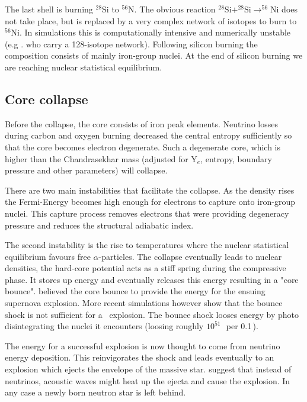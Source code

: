 The last shell is burning $^{28}$Si to $^{56}$N. The obvious reaction $^{28}\textrm{Si}+^{28}\textrm{Si}\rightarrow^{56}\textrm{Ni}$ does not take place, but is replaced by a very complex network of isotopes to burn to $^{56}\textrm{Ni}$. In simulations this is computationally intensive and numerically unstable (e.g .  \citet{1978ApJ...225.1021W} who carry a 128-isotope network). 
Following silicon burning the composition consists of mainly iron-group nuclei. 
At the end of silicon burning we are reaching nuclear statistical equilibrium. 

\subsection{Core collapse} Before the collapse,  the core consists of iron peak elements. Neutrino losses during carbon and oxygen burning decreased the central entropy sufficiently so that the core becomes electron degenerate. Such a degenerate core, which is higher than the Chandrasekhar mass (adjusted for Y$_e$, entropy, boundary pressure and other parameters) will collapse. 

There are two main instabilities that facilitate the collapse. As the density rises the Fermi-Energy becomes high enough for electrons to capture onto iron-group nuclei. This capture process removes electrons that were providing degeneracy pressure and reduces the structural adiabatic index. 

The second instability is the rise to temperatures where the nuclear statistical equilibrium favours free $\alpha$-particles. The collapse eventually leads to nuclear densities, the hard-core potential acts as a stiff spring during the compressive phase. It stores up energy and eventually releases this energy resulting in a "core bounce".  
\citet{1985PhRvL..55..126B,1987PhRvL..59..736B} believed the core bounce to provide the energy for the ensuing supernova explosion. More recent simulations however show that the bounce shock is not sufficient for a \snii\ explosion. The bounce shock looses energy by photo disintegrating the nuclei it encounters (loosing roughly $10^{51}$\,\erg\ per 0.1\,\msun).

The energy for a successful explosion is now thought to come from neutrino energy deposition. This reinvigorates the shock and leads eventually to an explosion which ejects the envelope of the massive star. \cite{2007ApJ...655..416B} suggest that instead of neutrinos, acoustic waves might heat up the ejecta and cause the explosion. In any case a newly born neutron star is left behind.


